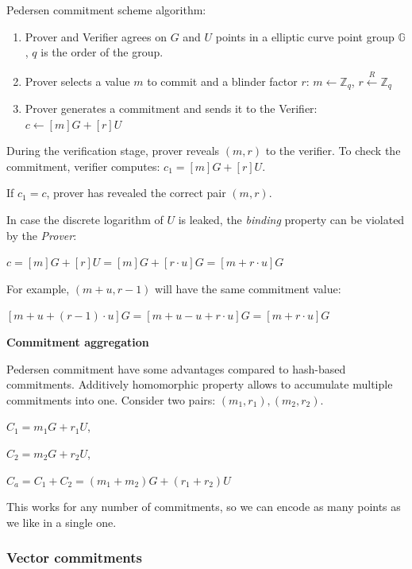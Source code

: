 \documentclass[../lecture-notes.tex]{subfiles}
\begin{document}
Pedersen commitment scheme algorithm:
\begin{enumerate}
    \item Prover and Verifier agrees on $G$ and $U$ points in a elliptic curve point group $\mathbb{G}$, $q$ is the order of the group.
    \item Prover selects a value $m$ to commit and a blinder factor $r$:
            $m \leftarrow \mathbb{Z}_q$,
            $r \xleftarrow{R} \mathbb{Z}_q$
    \item Prover generates a commitment and sends it to the Verifier:
            $c \gets [m]G + [r]U$
\end{enumerate}

During the verification stage, prover reveals $(m, r)$ to the verifier. 
To check the commitment, verifier computes: $c_1 = [m]G + [r]U$.

If $c_1 = c$, prover has revealed the correct pair $(m, r)$.

\begin{remark}
    In case the discrete logarithm of $U$ is leaked, the \textit{binding} property can be violated by the \textit{Prover}:

    $c = [m]G + [r]U = [m] G + [r \cdot u]G = [m + r \cdot u] G$
    
    For example, $(m + u, r - 1)$ will have the same commitment value:

    $[m+u + (r-1) \cdot u] G = [m + u - u + r \cdot u] G = [m + r \cdot u] G$ 
        
\end{remark}

\textbf{Commitment aggregation}

Pedersen commitment have some advantages compared to hash-based commitments.
Additively homomorphic property allows to accumulate multiple commitments into one.
Consider two pairs: $(m_1, r_1), (m_2, r_2)$.

\begin{center}
    $C_1 = m_1G + r_1U$,

    $C_2 = m_2G + r_2U$,

    $C_a = C_1 + C_2 = (m_1 + m_2)G + (r_1 + r_2)U$
\end{center}

This works for any number of commitments, so we can encode as many points as we like in a single one.

\vspace{0.5 cm}

\subsubsection{Vector commitments}
\end{document}
